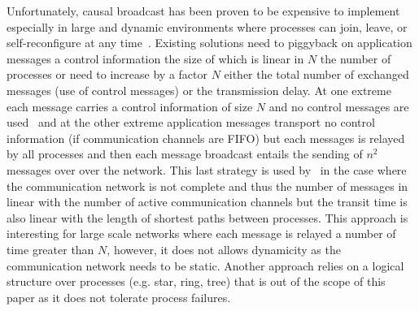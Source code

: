 Unfortunately, causal broadcast has been proven to be expensive to implement especially in large and dynamic environments where processes can join, leave, or self-reconfigure at any
time~\cite{charronbost1991concerning}. Existing solutions need to piggyback on application messages a control information the size of which is linear in $N$ the number of processes or need to increase by a factor $N$  either the total number of exchanged messages (use of control messages) or the transmission delay. At one extreme each message carries a control information of size $N$ and no control messages are used~\cite{birman1987reliable} and at the other extreme application messages transport no control information (if communication channels are FIFO) but each messages is relayed by all processes and then each message broadcast entails the sending of  $n^2$ messages over over the network. This last strategy is used by~\cite{friedman2004causal} in the case where the communication network is not complete and thus the number of messages in linear with the number of active communication channels but the transit time is also linear with the length of shortest paths between processes. This approach is interesting for large scale networks where each message is relayed a number of time greater than $N$, however, it does not allows dynamicity as the communication network needs to be static. Another approach relies on a logical structure over processes (e.g. star, ring, tree) that is out of the scope of this paper as it does not tolerate process failures. 


